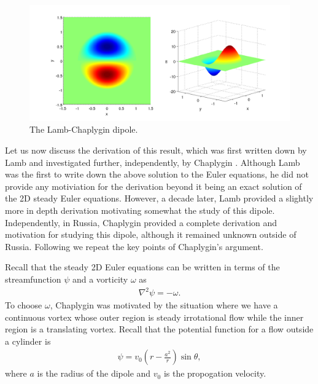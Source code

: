 \begin{figure}
\begin{center}
\includegraphics[width=\textwidth]{lamb_dipole}
\caption{The Lamb-Chaplygin dipole.}
\label{lamb_dipole_plot}
\end{center}
\end{figure}
Let us now discuss the derivation of this result, which was first written down by Lamb and investigated further, independently, by Chaplygin \cite{meleshko1994}. Although Lamb was the first to write down the above solution to the Euler equations, he did not provide any motiviation for the derivation beyond it being an exact solution of the 2D steady Euler equations. However, a decade later, Lamb provided a slightly more in depth derivation motivating somewhat the study of this dipole. Independently, in Russia, Chaplygin provided a complete derivation and motivation for studying this dipole, although it remained unknown outside of Russia. Following \cite{meleshko1994} we repeat the key points of Chaplygin's argument. 

Recall that the steady 2D Euler equations can be written in terms of the streamfunction $\psi$ and a vorticity $\omega$ as
\begin{align}
\nabla^{2} \psi = - \omega.\label{vort_eq_chap}
\end{align}
To choose $\omega$, Chaplygin was motivated by the situation where we have a continuous vortex whose outer region is steady irrotational flow while the inner region is a translating vortex. Recall that the potential function for a flow outside a cylinder is
\begin{align}
\psi = v_{0}\left(r - \frac{a^{2}}{r}\right)\sin\theta ,
\end{align}
where $a$ is the radius of the dipole and $v_{0}$ is the propogation velocity. 


